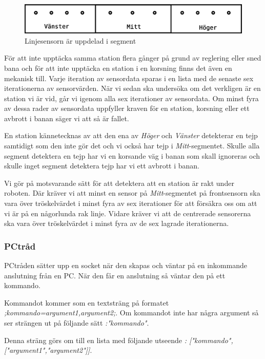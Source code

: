 \begin{figure}[h!]
	\centering
	\includegraphics[scale=0.4]{grafik/huvud-linjesensor}
	\caption{Linjesensorn är uppdelad i segment} \label{huvud-linjesensor}
\end{figure}

För att inte upptäcka samma station flera gånger på grund av reglering eller sned bana och för att inte upptäcka en station i en korsning finns det även en mekanisk till. Varje iteration av sensordata sparas i en lista med de senaste sex iterationerna av sensorvärden. När vi sedan ska undersöka om det verkligen är en station vi är vid, går vi igenom alla sex iterationer av sensordata. Om minst fyra av dessa rader av sensordata uppfyller kraven för en station, korsning eller ett avbrott i banan säger vi att så är fallet.

En station kännetecknas av att den ena av \textit{Höger} och \textit{Vänster} detekterar en tejp samtidigt som den inte gör det och vi också har tejp i \textit{Mitt}-segmentet. Skulle alla segment detektera en tejp har vi en korsande väg i banan som skall ignoreras och skulle inget segment detektera tejp har vi ett avbrott i banan.

Vi gör på motsvarande sätt för att detektera att en station är rakt under roboten. Där kräver vi att minst en sensor på \textit{Mitt}-segmentet på frontsensorn ska vara över tröskelvärdet i minst fyra av sex iterationer för att försäkra oss om att vi är på en någorlunda rak linje. Vidare kräver vi att de centrerade sensorerna ska vara över tröskelvärdet i minst fyra av de sex lagrade iterationerna.

\subsubsection{PCtråd}
PCtråden sätter upp en socket när den skapas och väntar på en inkommande anslutning från en PC. När den får en anslutning så väntar den på ett kommando.

 Kommandot kommer som en textsträng på formatet \textit{;kommando=argument1,argument2;}. Om kommandot inte har några argument så ser strängen ut på följande sätt \textit{:"kommando"}.

Denna sträng görs om till en lista med följande utseende \textit{: ["kommando",["argument1","argument2"]]}.

